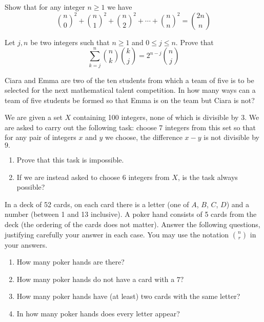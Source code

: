 \documentclass{pset}
\begin{document}
\begin{problems}
\begin{problem}
    Show that for any integer \(n \geq 1\) we have
    $$
    \binom{n}{0}^2 + \binom{n}{1}^2 + \binom{n}{2}^2 + \cdots + \binom{n}{n}^2 = \binom{2n}{n}
    $$
\end{problem}

\begin{problem}
    Let \(j, n\) be two integers such that \(n \geq 1\) and \(0 \leq j \leq n .\) Prove that
    $$
\sum_{k = j}^n \binom{n}{k} \binom{k}{j} = 2^{n - j} \binom{n}{j}
    $$
\end{problem}

\begin{problem}
    Ciara and Emma are two of the ten students from which a team of five is to be selected for the next mathematical talent competition. In how many ways can a team of five students be formed so that Emma is on the team but Ciara is not?
\end{problem}

\begin{problem}
    We are given a set \(X\) containing 100 integers, none of which is divisible by \(3 .\) We are asked to carry out the following task: choose 7 integers from this set so that for any pair of integers \(x\) and \(y\) we choose, the difference \(x-y\) is not divisible by \(9 .\)
    \begin{enumerate}
        \item Prove that this task is impossible.
        \item If we are instead asked to choose 6 integers from $X$, is the task always possible?
    \end{enumerate}
\end{problem}

\begin{problem}
    In a deck of 52 cards, on each card there is a letter (one of $A$, $B$, $C$, $D$) and a number
    (between 1 and 13 inclusive). A poker hand consists of 5 cards from the deck (the ordering of the cards does not matter). Answer the following questions, justifying carefully your answer in each case. You may use the notation $\binom{n}{r}$ in your answers.
    \begin{enumerate}
        \item How many poker hands are there?
        \item How many poker hands do not have a card with a \(7 ?\)
        \item How many poker hands have (at least) two cards with the same letter?
        \item In how many poker hands does every letter appear?
    \end{enumerate}
\end{problem}


\end{problems}
\end{document}
